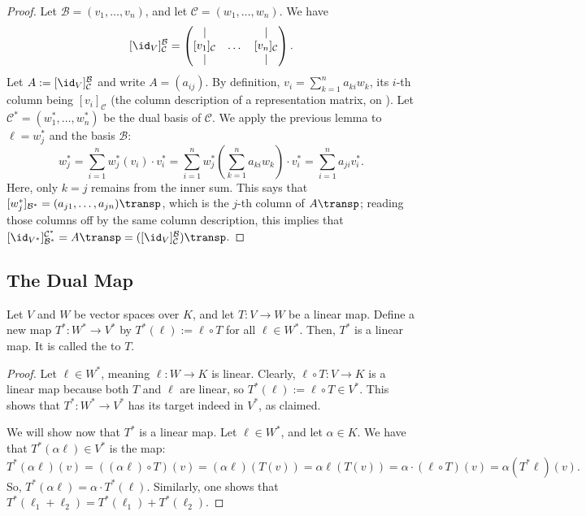 \begin{proof}
  Let $\mathcal{B} = (v_1, \dots, v_n)$, and let $\mathcal{C} = (w_1, \dots, w_n)$. We have 
  \[[\id_V]_{\mathcal{C}}^{\mathcal{B}} = \begin{pmatrix} | & & | \\ [v_1]_{\mathcal{C}} & \dots & [v_n]_{\mathcal{C}} \\ | & & | \end{pmatrix}.\]
  Let $A := [\id_V]_{\mathcal{C}}^{\mathcal{B}}$ and write $A = (a_{ij})$. By definition, $v_i = \sum_{k=1}^n a_{ki} w_k$, its $i$-th column being $[v_i]_{\mathcal{C}}$ (the column description of a representation matrix, on ).
  Let $\mathcal{C}^* = (w_1^*, \dots, w_n^*)$ be the dual basis of $\mathcal{C}$. We apply the previous lemma to $\ell = w_j^*$ and the basis $\mathcal{B}$:
  \[ w_j^* = \sum_{i=1}^n w_j^*(v_i) \cdot v_i^* = \sum_{i=1}^n w_j^*\left(\sum_{k=1}^n a_{ki} w_k\right) \cdot v_i^* = \sum_{i=1}^n a_{ji} v_i^*. \]
  Here, only $k = j$ remains from the inner sum. This says that $[w_j^*]_{\mathcal{B}^*} = (a_{j1}, \dots, a_{jn})\transp$, which is the $j$-th column of $A\transp$; reading those columns off by the same column description, this implies that $[\id_{V^*}]_{\mathcal{B}^*}^{\mathcal{C}^*} = A\transp = ([\id_V]_{\mathcal{C}}^{\mathcal{B}})\transp$.
\end{proof}

\subsection{The Dual Map}
\begin{lemma}
  \label{lem:dual_map}
  Let $V$ and $W$ be vector spaces over $K$, and let $T \colon V \to W$ be a linear map. Define a new map $T^* \colon W^* \to V^*$ by $T^*(\ell) := \ell \circ T$ for all $\ell \in W^*$. Then, $T^*$ is a linear map. It is called the  to $T$.
\end{lemma}

\begin{proof}
  Let $\ell \in W^*$, meaning $\ell \colon W \to K$ is linear. Clearly, $\ell \circ T \colon V \to K$ is a linear map because both $T$ and $\ell$ are linear, so $T^*(\ell) := \ell \circ T \in V^*$. This shows that $T^* \colon W^* \to V^*$ has its target indeed in $V^*$, as claimed.

  We will show now that $T^*$ is a linear map. Let $\ell \in W^*$, and let $\alpha \in K$. We have that $T^*(\alpha \ell) \in V^*$ is the map:
  $$T^*(\alpha \ell)(v) = ((\alpha \ell) \circ T)(v) = (\alpha \ell)(T(v)) = \alpha \ell(T(v)) = \alpha \cdot (\ell \circ T)(v) = \alpha (T^* \ell)(v).$$
  So, $T^*(\alpha \ell) = \alpha \cdot T^*(\ell)$. Similarly, one shows that $T^*(\ell_1 + \ell_2) = T^*(\ell_1) + T^*(\ell_2)$.
\end{proof}

